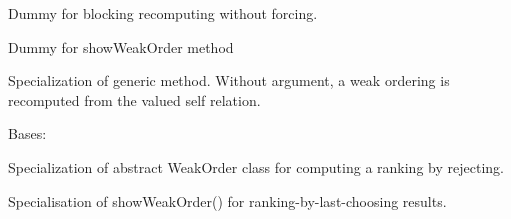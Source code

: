 \documentclass[letterpaper,10pt,english]{sphinxmanual}
\begin{document}
\begin{fulllineitems}
\begin{fulllineitems}
\end{fulllineitems}


\begin{fulllineitems}
\label{techDoc:weakOrders.RankingByChoosingDigraph.computeRankingByLastChoosing}
Dummy for blocking recomputing without forcing.

\end{fulllineitems}


\begin{fulllineitems}
\label{techDoc:weakOrders.RankingByChoosingDigraph.showRankingByChoosing}
Dummy for showWeakOrder method

\end{fulllineitems}


\begin{fulllineitems}
\label{techDoc:weakOrders.RankingByChoosingDigraph.showWeakOrder}
Specialization of generic method.
Without argument, a weak ordering is recomputed from the
valued self relation.

\end{fulllineitems}


\end{fulllineitems}


\begin{fulllineitems}
\label{techDoc:weakOrders.RankingByLastChoosingDigraph}
Bases: {\hyperref[techDoc:weakOrders.RankingByChoosingDigraph]{\emph{}}}

Specialization of abstract WeakOrder class for computing a ranking by rejecting.

\begin{fulllineitems}
\label{techDoc:weakOrders.RankingByLastChoosingDigraph.showWeakOrder}
Specialisation of showWeakOrder() for ranking-by-last-choosing results.

\end{fulllineitems}


\end{fulllineitems}
\end{document}
